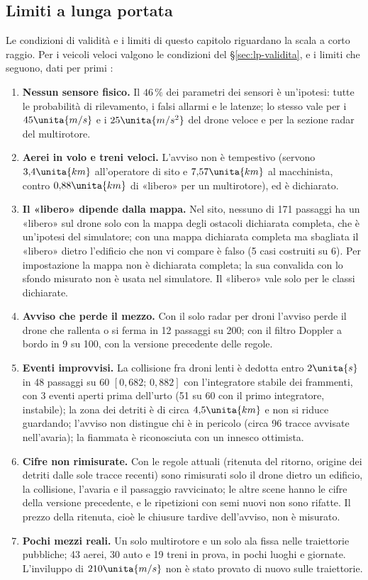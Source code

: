 \subsection{Limiti a lunga portata}\label{sec:lim-lunga}

Le condizioni di validità e i limiti di questo capitolo riguardano la scala a corto raggio. Per i veicoli veloci valgono le condizioni del \S\ref{sec:lp-validita}, e i limiti che seguono, dati per primi :
\begin{enumerate}[label=L\arabic*.,leftmargin=2.2em]
\item \textbf{Nessun sensore fisico.} Il $46\,\%$ dei parametri dei sensori è un'ipotesi: tutte le probabilità di rilevamento, i falsi allarmi e le latenze; lo stesso vale per i $45\unita{m/s}$ e i $25\unita{m/s^2}$ del drone veloce e per la sezione radar del multirotore.
\item \textbf{Aerei in volo e treni veloci.} L'avviso non è tempestivo (servono $3{,}4\unita{km}$ all'operatore di sito e $7{,}57\unita{km}$ al macchinista, contro $0{,}88\unita{km}$ di «libero» per un multirotore), ed è dichiarato.
\item \textbf{Il «libero» dipende dalla mappa.} Nel sito, nessuno di 171 passaggi ha un «libero» sul drone solo con la mappa degli ostacoli dichiarata completa, che è un'ipotesi del simulatore; con una mappa dichiarata completa ma sbagliata il «libero» dietro l'edificio che non vi compare è falso (5 casi costruiti su 6). Per impostazione la mappa non è dichiarata completa; la sua convalida con lo sfondo misurato non è usata nel simulatore. Il «libero» vale solo per le classi dichiarate.
\item \textbf{Avviso che perde il mezzo.} Con il solo radar per droni l'avviso perde il drone che rallenta o si ferma in 12 passaggi su 200; con il filtro Doppler a bordo in 9 su 100, con la versione precedente delle regole.
\item \textbf{Eventi improvvisi.} La collisione fra droni lenti è dedotta entro $2\unita{s}$ in 48 passaggi su 60 $[0{,}682;\,0{,}882]$ con l'integratore stabile dei frammenti, con 3 eventi aperti prima dell'urto (51 su 60 con il primo integratore, instabile); la zona dei detriti è di circa $4{,}5\unita{km}$ e non si riduce guardando; l'avviso non distingue chi è in pericolo (circa 96 tracce avvisate nell'avaria); la fiammata è riconosciuta con un innesco ottimista.
\item \textbf{Cifre non rimisurate.} Con le regole attuali (ritenuta del ritorno, origine dei detriti dalle sole tracce recenti) sono rimisurati solo il drone dietro un edificio, la collisione, l'avaria e il passaggio ravvicinato; le altre scene hanno le cifre della versione precedente, e le ripetizioni con semi nuovi non sono rifatte. Il prezzo della ritenuta, cioè le chiusure tardive dell'avviso, non è misurato.
\item \textbf{Pochi mezzi reali.} Un solo multirotore e un solo ala fissa nelle traiettorie pubbliche; 43 aerei, 30 auto e 19 treni in prova, in pochi luoghi e giornate. L'inviluppo di $210\unita{m/s}$ non è stato provato di nuovo sulle traiettorie.
\end{enumerate}

